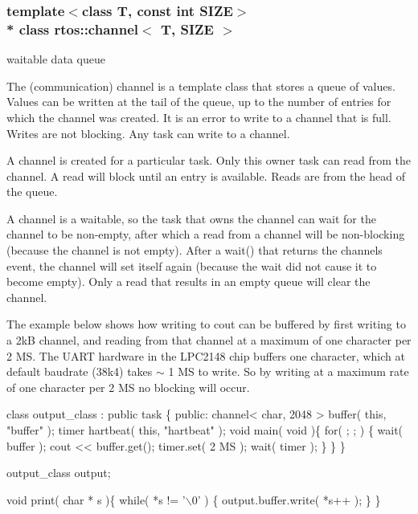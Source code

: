 \subsubsection*{template$<$class T, const int S\+I\+ZE$>$\\*
class rtos\+::channel$<$ T, S\+I\+Z\+E $>$}

waitable data queue 

The (communication) channel is a template class that stores a queue of values. Values can be written at the tail of the queue, up to the number of entries for which the channel was created. It is an error to write to a channel that is full. Writes are not blocking. Any task can write to a channel.

A channel is created for a particular task. Only this owner task can read from the channel. A read will block until an entry is available. Reads are from the head of the queue.

A channel is a waitable, so the task that owns the channel can wait for the channel to be non-\/empty, after which a read from a channel will be non-\/blocking (because the channel is not empty). After a wait() that returns the channel\textquotesingle{}s event, the channel will set itself again (because the wait did not cause it to become empty). Only a read that results in an empty queue will clear the channel.

The example below shows how writing to cout can be buffered by first writing to a 2kB channel, and reading from that channel at a maximum of one character per 2 MS. The U\+A\+RT hardware in the L\+P\+C2148 chip buffers one character, which at default baudrate (38k4) takes $\sim$ 1 MS to write. So by writing at a maximum rate of one character per 2 MS no blocking will occur.


\begin{DoxyCode}
\textcolor{keyword}{class }output\_class : \textcolor{keyword}{public} task \{
\textcolor{keyword}{public}:
   channel< char, 2048 > buffer( \textcolor{keyword}{this}, \textcolor{stringliteral}{"buffer"} );
   timer hartbeat( \textcolor{keyword}{this}, \textcolor{stringliteral}{"hartbeat"} );
   \textcolor{keywordtype}{void} main( \textcolor{keywordtype}{void} )\{
      \textcolor{keywordflow}{for}( ; ; ) \{
         wait( buffer );
         cout << buffer.get();
         timer.set( 2 MS );
         wait( timer );
     \}
   \}
\}

output\_class output;

\textcolor{keywordtype}{void} print( \textcolor{keywordtype}{char} * s )\{
   \textcolor{keywordflow}{while}( *s != \textcolor{charliteral}{'\(\backslash\)0'} ) \{ output.buffer.write( *s++ ); \}
\}
\end{DoxyCode}
 

